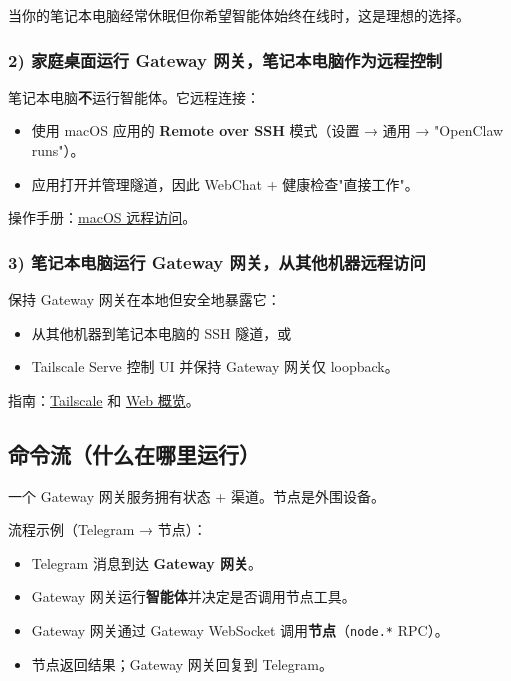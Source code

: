 当你的笔记本电脑经常休眠但你希望智能体始终在线时，这是理想的选择。

\subsubsection{2) 家庭桌面运行 Gateway 网关，笔记本电脑作为远程控制}


笔记本电脑\textbf{不}运行智能体。它远程连接：

\begin{itemize}
  \item 使用 macOS 应用的 \textbf{Remote over SSH} 模式（设置 → 通用 → "OpenClaw runs"）。
  \item 应用打开并管理隧道，因此 WebChat + 健康检查"直接工作"。
\end{itemize}


操作手册：\href{/platforms/mac/remote}{macOS 远程访问}。

\subsubsection{3) 笔记本电脑运行 Gateway 网关，从其他机器远程访问}


保持 Gateway 网关在本地但安全地暴露它：

\begin{itemize}
  \item 从其他机器到笔记本电脑的 SSH 隧道，或
  \item Tailscale Serve 控制 UI 并保持 Gateway 网关仅 loopback。
\end{itemize}


指南：\href{/gateway/tailscale}{Tailscale} 和 \href{/web}{Web 概览}。

\subsection{命令流（什么在哪里运行）}


一个 Gateway 网关服务拥有状态 + 渠道。节点是外围设备。

流程示例（Telegram → 节点）：

\begin{itemize}
  \item Telegram 消息到达 \textbf{Gateway 网关}。
  \item Gateway 网关运行\textbf{智能体}并决定是否调用节点工具。
  \item Gateway 网关通过 Gateway WebSocket 调用\textbf{节点}（\texttt{node.*} RPC）。
  \item 节点返回结果；Gateway 网关回复到 Telegram。
\end{itemize}


